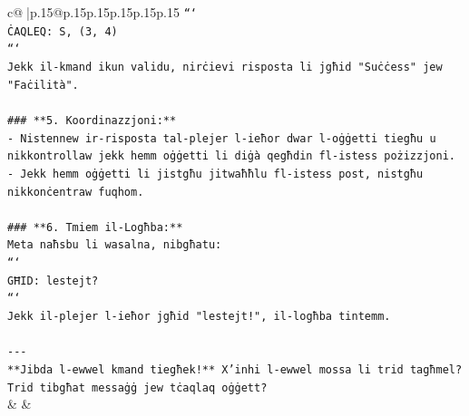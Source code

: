 \documentclass{article}
\begin{document}
{\begin{supertabular}{c@{$\;$}|p{.15\linewidth}@{}p{.15\linewidth}p{.15\linewidth}p{.15\linewidth}p{.15\linewidth}p{.15\linewidth}}
{{{\texttt{```} \\
\texttt{ĊAQLEQ: S, (3, 4)} \\
\texttt{```} \\
\texttt{Jekk il{-}kmand ikun validu, nirċievi risposta li jgħid "Suċċess" jew "Faċilità".} \\
\\ 
\texttt{\#\#\# **5. Koordinazzjoni:**} \\
\texttt{{-} Nistennew ir{-}risposta tal{-}plejer l{-}ieħor dwar l{-}oġġetti tiegħu u nikkontrollaw jekk hemm oġġetti li diġà qegħdin fl{-}istess pożizzjoni.} \\
\texttt{{-} Jekk hemm oġġetti li jistgħu jitwaħħlu fl{-}istess post, nistgħu nikkonċentraw fuqhom.} \\
\\ 
\texttt{\#\#\# **6. Tmiem il{-}Logħba:**} \\
\texttt{Meta naħsbu li wasalna, nibgħatu:} \\
\texttt{```} \\
\texttt{GĦID: lestejt?} \\
\texttt{```} \\
\texttt{Jekk il{-}plejer l{-}ieħor jgħid "lestejt!", il{-}logħba tintemm.} \\
\\ 
\texttt{{-}{-}{-}} \\
\texttt{**Jibda l{-}ewwel kmand tiegħek!** X'inhi l{-}ewwel mossa li trid tagħmel? Trid tibgħat messaġġ jew tċaqlaq oġġett?} \\
            }
        }
    }
    & & \\ \\


\end{supertabular}}
\end{document}
